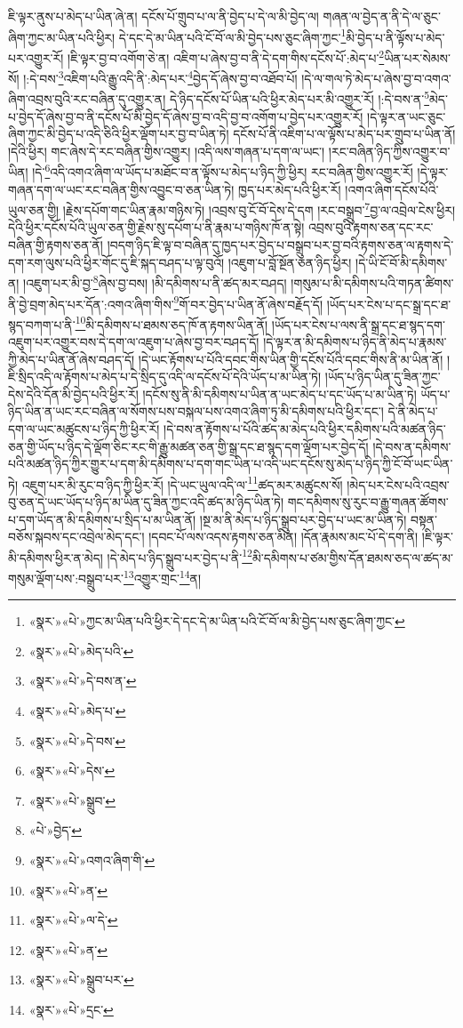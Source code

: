 ཇི་ལྟར་ནུས་པ་མེད་པ་ཡིན་ཞེ་ན། དངོས་པོ་གྲུབ་པ་ལ་ནི་བྱེད་པ་དེ་ལ་མི་བྱེད་ལ། གཞན་ལ་བྱེད་ན་ནི་དེ་ལ་ཅུང་ཞིག་ཀྱང་མ་ཡིན་པའི་ཕྱིར། དེ་དང་དེ་མ་ཡིན་པའི་ངོ་བོ་ལ་མི་བྱེད་པས་ཅུང་ཞིག་ཀྱང་\footnote{«སྣར་»«པེ་»ཀྱང་མ་ཡིན་པའི་ཕྱིར་དེ་དང་དེ་མ་ཡིན་པའི་ངོ་བོ་ལ་མི་བྱེད་པས་ཅུང་ཞིག་ཀྱང་}མི་བྱེད་པ་ནི་ལྟོས་པ་མེད་པར་འགྱུར་རོ། །ཇི་ལྟར་བྱ་བ་འགོག་ཅེ་ན། འཇིག་པ་ཞེས་བྱ་བ་ནི་དེ་དག་གིས་དངོས་པོ་:མེད་པ་\footnote{«སྣར་»«པེ་»མེད་པའི་}ཡིན་པར་སེམས་སོ། །:དེ་བས་\footnote{«སྣར་»«པེ་»དེ་བས་ན་}འཇིག་པའི་རྒྱུ་འདི་ནི་:མེད་པར་\footnote{«སྣར་»«པེ་»མེད་པ་}བྱེད་དོ་ཞེས་བྱ་བ་འཐོབ་པོ། །དེ་ལ་གལ་ཏེ་མེད་པ་ཞེས་བྱ་བ་འགའ་ཞིག་འབྲས་བུའི་རང་བཞིན་དུ་འགྱུར་ན། དེ་ཉིད་དངོས་པོ་ཡིན་པའི་ཕྱིར་མེད་པར་མི་འགྱུར་རོ། །:དེ་བས་ན་\footnote{«སྣར་»«པེ་»དེ་བས་}མེད་པ་བྱེད་དོ་ཞེས་བྱ་བ་ནི་དངོས་པོ་མི་བྱེད་དོ་ཞེས་བྱ་བ་འདི་བྱ་བ་འགོག་པ་བྱེད་པར་འགྱུར་རོ། །དེ་ལྟར་ན་ཡང་ཅུང་ཞིག་ཀྱང་མི་བྱེད་པ་འདི་ཅིའི་ཕྱིར་ལྡོག་པར་བྱ་བ་ཡིན་ཏེ། དངོས་པོ་ནི་འཇིག་པ་ལ་ལྟོས་པ་མེད་པར་གྲུབ་པ་ཡིན་ནོ། །དེའི་ཕྱིར། གང་ཞེས་དེ་རང་བཞིན་གྱིས་འགྱུར། །འདི་ལས་གཞན་པ་དག་ལ་ཡང་། །རང་བཞིན་ཉིད་ཀྱིས་འགྱུར་བ་ཡིན། །དེ་\footnote{«སྣར་»«པེ་»དེས་}འདི་འགའ་ཞིག་ལ་ཡོད་པ་མཐོང་བ་ན་ལྟོས་པ་མེད་པ་ཉིད་ཀྱི་ཕྱིར། རང་བཞིན་གྱིས་འགྱུར་རོ། །དེ་ལྟར་གཞན་དག་ལ་ཡང་རང་བཞིན་གྱིས་འབྱུང་བ་ཅན་ཡིན་ཏེ། ཁྱད་པར་མེད་པའི་ཕྱིར་རོ། །འགའ་ཞིག་དངོས་པོའི་ཡུལ་ཅན་གྱི། །རྗེས་དཔོག་གང་ཡིན་རྣམ་གཉིས་ཏེ། །འབྲས་བུ་ངོ་བོ་དེས་དེ་དག །རང་བསྒྲུབ་\footnote{«སྣར་»«པེ་»སྒྲུབ་}བྱ་ལ་འབྲེལ་ངེས་ཕྱིར། དེའི་ཕྱིར་དངོས་པོའི་ཡུལ་ཅན་གྱི་རྗེས་སུ་དཔོག་པ་ནི་རྣམ་པ་གཉིས་ཁོ་ན་སྟེ། འབྲས་བུའི་རྟགས་ཅན་དང་རང་བཞིན་གྱི་རྟགས་ཅན་ནོ། །བདག་ཉིད་ཇི་ལྟ་བ་བཞིན་དུ་ཁྱད་པར་བྱེད་པ་བསྒྲུབ་པར་བྱ་བའི་རྟགས་ཅན་ལ་རྟགས་དེ་དག་རག་ལུས་པའི་ཕྱིར་གོང་དུ་ཇི་སྐད་བཤད་པ་ལྟ་བུའོ། །འཇུག་པ་བློ་སྔོན་ཅན་ཉིད་ཕྱིར། །དེ་ཡི་ངོ་བོ་མི་དམིགས་ན། །འཇུག་པར་མི་བྱ་\footnote{«པེ་»བྱེད་}ཞེས་བྱ་བས། །མི་དམིགས་པ་ནི་ཚད་མར་བཤད། །གསུམ་པ་མི་དམིགས་པའི་གཏན་ཚིགས་ནི་བྱེ་བྲག་མེད་པར་དོན་:འགའ་ཞིག་གིས་\footnote{«སྣར་»«པེ་»འགའ་ཞིག་གི་}གོ་བར་བྱེད་པ་ཡིན་ནོ་ཞེས་བརྗོད་དོ། །ཡོད་པར་ངེས་པ་དང་སྒྲ་དང་ཐ་སྙད་བཀག་པ་ནི་\footnote{«སྣར་»«པེ་»ན་}མི་དམིགས་པ་ཐམས་ཅད་ཁོ་ན་རྟགས་ཡིན་ནོ། །ཡོད་པར་ངེས་པ་ལས་ནི་སྒྲ་དང་ཐ་སྙད་དག་འཇུག་པར་འགྱུར་བས་དེ་དག་ལ་འཇུག་པ་ཞེས་བྱ་བར་བཤད་དོ། །དེ་ལྟར་ན་མི་དམིགས་པ་ཉིད་ནི་མེད་པ་རྣམས་ཀྱི་མེད་པ་ཡིན་ནོ་ཞེས་བཤད་དོ། །དེ་ཡང་རྟོགས་པ་པོའི་དབང་གིས་ཡིན་གྱི་དངོས་པོའི་དབང་གིས་ནི་མ་ཡིན་ནོ། །ཇི་སྲིད་འདི་ལ་རྟོགས་པ་མེད་པ་དེ་སྲིད་དུ་འདི་ལ་དངོས་པོ་དེའི་ཡོད་པ་མ་ཡིན་ཏེ། །ཡོད་པ་ཉིད་ཡིན་དུ་ཟིན་ཀྱང་དེས་དེའི་དོན་མི་བྱེད་པའི་ཕྱིར་རོ། །དངོས་སུ་ནི་མི་དམིགས་པ་ཡིན་ན་ཡང་མེད་པ་དང་ཡོད་པ་མ་ཡིན་ཏེ། ཡོད་པ་ཉིད་ཡིན་ན་ཡང་རང་བཞིན་ལ་སོགས་པས་བསྐལ་པས་འགའ་ཞིག་ཏུ་མི་དམིགས་པའི་ཕྱིར་དང་། དེ་ནི་མེད་པ་དག་ལ་ཡང་མཚུངས་པ་ཉིད་ཀྱི་ཕྱིར་རོ། །དེ་བས་ན་རྟོགས་པ་པོའི་ཚད་མ་མེད་པའི་ཕྱིར་དམིགས་པའི་མཚན་ཉིད་ཅན་གྱི་ཡོད་པ་ཉིད་དེ་ལྡོག་ཅིང་རང་གི་རྒྱུ་མཚན་ཅན་གྱི་སྒྲ་དང་ཐ་སྙད་དག་ལྡོག་པར་བྱེད་དོ། །དེ་བས་ན་དམིགས་པའི་མཚན་ཉིད་ཀྱིར་གྱུར་པ་དག་མི་དམིགས་པ་དག་གང་ཡིན་པ་འདི་ཡང་དངོས་སུ་མེད་པ་ཉིད་ཀྱི་ངོ་བོ་ཡང་ཡིན་ཏེ། འཇུག་པར་མི་རུང་བ་ཉིད་ཀྱི་ཕྱིར་རོ། །དེ་ཡང་ཡུལ་འདི་ལ་\footnote{«སྣར་»«པེ་»ལ་དེ་}ཚད་མར་མཚུངས་སོ། །མེད་པར་ངེས་པའི་འབྲས་བུ་ཅན་དེ་ཡང་ཡོད་པ་ཉིད་མ་ཡིན་དུ་ཟིན་ཀྱང་འདི་ཚད་མ་ཉིད་ཡིན་ཏེ། གང་དམིགས་སུ་རུང་བ་རྒྱུ་གཞན་ཚོགས་པ་དག་ཡོད་ན་མི་དམིགས་པ་སྲིད་པ་མ་ཡིན་ནོ། །སྔ་མ་ནི་མེད་པ་ཉིད་སྒྲུབ་པར་བྱེད་པ་ཡང་མ་ཡིན་ཏེ། བསྟན་བཅོས་སྐབས་དང་འབྲེལ་མེད་དང་། །དབང་པོ་ལས་འདས་རྟགས་ཅན་མིན། །དོན་རྣམས་མང་པོ་དེ་དག་ནི། །ཇི་ལྟར་མི་དམིགས་ཕྱིར་ན་མེད། །དེ་མེད་པ་ཉིད་སྒྲུབ་པར་བྱེད་པ་ནི་\footnote{«སྣར་»«པེ་»ན་}མི་དམིགས་པ་ཙམ་གྱིས་དོན་ཐམས་ཅད་ལ་ཚད་མ་གསུམ་ལྡོག་པས་:བསྒྲུབ་པར་\footnote{«སྣར་»«པེ་»སྒྲུབ་པར་}འགྱུར་གྲང་\footnote{«སྣར་»«པེ་»དྲང་}ན། 